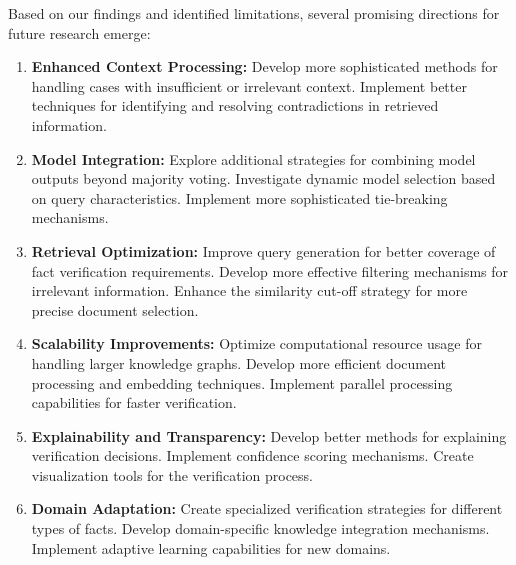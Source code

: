 Based on our findings and identified limitations, several promising directions for future research emerge:
\begin{enumerate}
    \item \textbf{Enhanced Context Processing:} Develop more sophisticated methods for handling cases with insufficient or irrelevant context. Implement better techniques for identifying and resolving contradictions in retrieved information.
    \item \textbf{Model Integration:} Explore additional strategies for combining model outputs beyond majority voting. Investigate dynamic model selection based on query characteristics. Implement more sophisticated tie-breaking mechanisms.
    \item \textbf{Retrieval Optimization:} Improve query generation for better coverage of fact verification requirements. Develop more effective filtering mechanisms for irrelevant information. Enhance the similarity cut-off strategy for more precise document selection.
    \item \textbf{Scalability Improvements:} Optimize computational resource usage for handling larger knowledge graphs. Develop more efficient document processing and embedding techniques. Implement parallel processing capabilities for faster verification.
    \item \textbf{Explainability and Transparency:} Develop better methods for explaining verification decisions. Implement confidence scoring mechanisms. Create visualization tools for the verification process.
    \item \textbf{Domain Adaptation:} Create specialized verification strategies for different types of facts. Develop domain-specific knowledge integration mechanisms. Implement adaptive learning capabilities for new domains.
\end{enumerate}